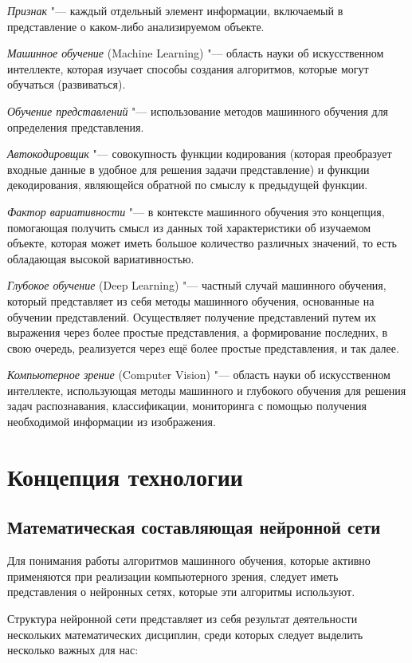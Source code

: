 \documentclass[bachelor, och, coursework]{SCWorks}
\begin{document}
    \textit{Признак} "--- каждый отдельный элемент информации, включаемый в представление о каком-либо анализируемом объекте.

    \textit{Машинное обучение} (Machine Learning) "--- область науки об искусственном интеллекте, которая изучает способы создания алгоритмов, которые могут обучаться (развиваться).

    \textit{Обучение представлений} "--- использование методов машинного обучения для определения представления.

    \textit{Автокодировщик} "--- совокупность функции кодирования (которая преобразует входные данные в удобное для решения задачи представление) и функции декодирования, являющейся обратной по смыслу к предыдущей функции.

    \textit{Фактор вариативности} "--- в контексте машинного обучения это концепция, помогающая получить смысл из данных той характеристики об изучаемом объекте, которая может иметь большое количество различных значений, то есть обладающая высокой вариативностью.

    \textit{Глубокое обучение} (Deep Learning) "--- частный случай машинного обучения, который представляет из себя методы машинного обучения, основанные на обучении представлений. Осуществляет получение представлений путем их выражения через более простые представления, а формирование последних, в свою очередь, реализуется через ещё более простые представления, и так далее.

    \textit{Компьютерное зрение} (Computer Vision) "--- область науки об искусственном интеллекте, использующая методы машинного и глубокого обучения для решения задач распознавания, классификации, мониторинга с помощью получения необходимой информации из изображения.

\section{Концепция технологии}

    \subsection{Математическая составляющая нейронной сети}
        Для понимания работы алгоритмов машинного обучения, которые активно применяются при реализации компьютерного зрения, следует иметь представления о нейронных сетях, которые эти алгоритмы используют.
        
        Структура нейронной сети представляет из себя результат деятельности нескольких математических дисциплин, среди которых следует выделить несколько важных для нас: 
            
\end{document}
